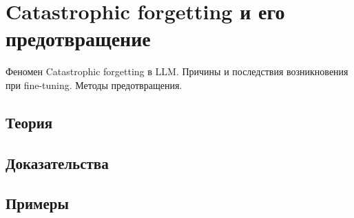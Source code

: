 
\section{Catastrophic forgetting и его предотвращение}
\label{sec:2.5.08-catastrophic-forgetting}

\begin{ticket}
Феномен Catastrophic forgetting в LLM. Причины и последствия возникновения при fine-tuning. Методы предотвращения.
\end{ticket}

\subsection*{Теория}

\subsection*{Доказательства}

\subsection*{Примеры}
